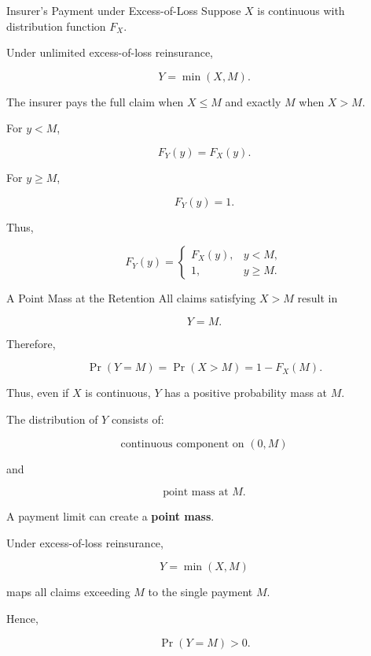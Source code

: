 \documentclass[
  ignorenonframetext,
  aspectratio=169,
]{beamer}
\begin{document}
\begin{frame}{Insurer's Payment under Excess-of-Loss}
\protect{}\label{insurers-payment-under-excess-of-loss}
Suppose \(X\) is continuous with distribution function \(F_X\).

Under unlimited excess-of-loss reinsurance,

\[
Y=\min(X,M).
\]

The insurer pays the full claim when \(X\leq M\) and exactly \(M\) when
\(X>M\).

For \(y<M\),

\[
F_Y(y)=F_X(y).
\]

For \(y\geq M\),

\[
F_Y(y)=1.
\]

Thus,

\[
\boxed{
F_Y(y)=
\begin{cases}
F_X(y), & y<M,\\
1, & y\geq M.
\end{cases}
}
\]
\end{frame}

\begin{frame}{A Point Mass at the Retention}
\protect{}\label{a-point-mass-at-the-retention}
All claims satisfying \(X>M\) result in

\[
Y=M.
\]

Therefore,

\[
\boxed{
\Pr(Y=M)=\Pr(X>M)=1-F_X(M).
}
\]

Thus, even if \(X\) is continuous, \(Y\) has a positive probability mass
at \(M\).

The distribution of \(Y\) consists of:

\[
\text{continuous component on }(0,M)
\]

and

\[
\text{point mass at }M.
\]
\end{frame}

\begin{frame}
\begin{tcolorbox}[enhanced jigsaw, arc=.35mm, bottomrule=.15mm, bottomtitle=1mm, breakable, colback=white, colbacktitle=quarto-callout-note-color!10!white, colframe=quarto-callout-note-color-frame, coltitle=black, left=2mm, leftrule=.75mm, opacityback=0, opacitybacktitle=0.6, rightrule=.15mm, title=\textcolor{quarto-callout-note-color}{\faInfo}\hspace{0.5em}{Key idea}, titlerule=0mm, toprule=.15mm, toptitle=1mm]

A payment limit can create a \textbf{point mass}.

Under excess-of-loss reinsurance,

\[
Y=\min(X,M)
\]

maps all claims exceeding \(M\) to the single payment \(M\).

Hence,

\[
\Pr(Y=M)>0.
\]

\end{tcolorbox}
\end{frame}
\end{document}

